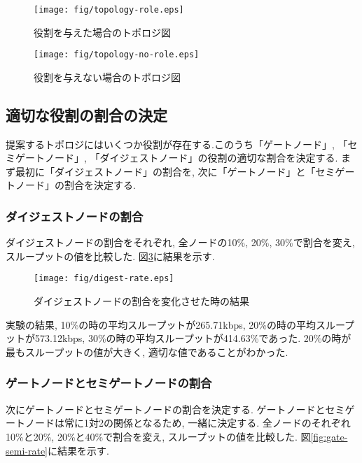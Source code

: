 \newpage

\begin{figure}[h]
  \centering
  \texttt{[image: fig/topology-role.eps]}
  \caption{役割を与えた場合のトポロジ図}
  \label{fig:topology-role}
\end{figure}

\newpage

\begin{figure}[h]
  \centering
  \texttt{[image: fig/topology-no-role.eps]}
  \caption{役割を与えない場合のトポロジ図}
  \label{fig:topology-no-role}
\end{figure}

\newpage

\subsection{適切な役割の割合の決定}
提案するトポロジにはいくつか役割が存在する.このうち「ゲートノード」, 「セミゲートノード」, 「ダイジェストノード」の役割の適切な割合を決定する. まず最初に「ダイジェストノード」の割合を, 次に「ゲートノード」と「セミゲートノード」の割合を決定する.

\subsubsection{ダイジェストノードの割合}
ダイジェストノードの割合をそれぞれ, 全ノードの10\%, 20\%, 30\%で割合を変え, スループットの値を比較した. 図\ref{fig:digest-rate}に結果を示す.

\begin{figure}[h]
  \centering
  \texttt{[image: fig/digest-rate.eps]}
  \caption{ダイジェストノードの割合を変化させた時の結果}
  \label{fig:digest-rate}
\end{figure}

実験の結果, 10\%の時の平均スループットが265.71kbps, 20\%の時の平均スループットが573.12kbps, 30\%の時の平均スループットが414.63\%であった. 20\%の時が最もスループットの値が大きく, 適切な値であることがわかった.

\subsubsection{ゲートノードとセミゲートノードの割合}
次にゲートノードとセミゲートノードの割合を決定する. ゲートノードとセミゲートノードは常に1対2の関係となるため, 一緒に決定する. 全ノードのそれぞれ10\%と20\%, 20\%と40\%で割合を変え, スループットの値を比較した. 図\ref{fig:gate-semi-rate}に結果を示す.

